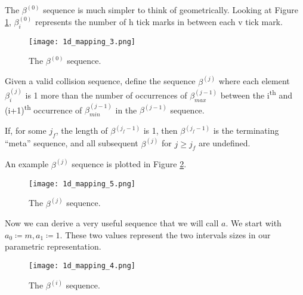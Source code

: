 The $\beta^{(0)}$ sequence is much simpler to think of geometrically. Looking at Figure \ref{fig:beta-sequence}, $\beta^{(0)}_i$ represents the number of h tick marks in between each v tick mark.

\begin{figure}[H]
  \begin{center}
    \texttt{[image: 1d\_mapping\_3.png]}
  \end{center}
  \vspace{-.2in} %
  \caption{\label{fig:beta-sequence} The $\beta^{(0)}$ sequence.}
\end{figure}

\begin{definition}
	Given a valid collision sequence, define the sequence $\beta^{(j)}$ where each element $\beta^{(j)}_i$ is 1 more than the number of occurrences of $\beta^{(j-1)}_{max}$ between the i\textsuperscript{th} and (i+1)\textsuperscript{th} occurrence of $\beta^{(j-1)}_{min}$ in the $\beta^{(j-1)}$ sequence.

	If, for some $j_f$, the length of $\beta^{(j_f-1)}$ is 1, then $\beta^{(j_f-1)}$ is the terminating ``meta'' sequence, and all subsequent $\beta^{(j)}$ for $j \ge j_f$ are undefined.
\end{definition}

An example $\beta^{(j)}$ sequence is plotted in Figure \ref{fig:beta-sequence-j}.

\begin{figure}[H]
  \begin{center}
    \texttt{[image: 1d\_mapping\_5.png]}
  \end{center}
  \vspace{-.2in} %
  \caption{\label{fig:beta-sequence-j} The $\beta^{(j)}$ sequence.}
\end{figure}

Now we can derive a very useful sequence that we will call $a$. We start with $a_0 \coloneqq m, a_1 \coloneqq 1$. These two values represent the two intervals sizes in our parametric representation.

\begin{figure}[H]
  \begin{center}
    \texttt{[image: 1d\_mapping\_4.png]}
  \end{center}
  \vspace{-.2in} %
  \caption{\label{fig:a-sequence} The $\beta^{(i)}$ sequence.}
\end{figure}

